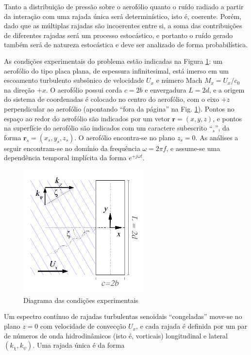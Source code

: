 \documentclass[a4paper, 11pt, twoside]{article}
\begin{document}
Tanto a distribuição de pressão sobre o aerofólio quanto o ruído radiado a partir da interação com uma rajada única será determinístico, isto é, coerente. Porém, dado que as múltiplas rajadas são incoerentes entre si, a soma das contribuições de diferentes rajadas será um processo estocástico, e portanto o ruído gerado também será de natureza estocástica e deve ser analizado de forma probabilística.

As condições experimentais do problema estão indicadas na Figura \ref{fig:experimental_setup}: um aerofólio do tipo placa plana, de espessura infinitesimal, está imerso em um escoamento turbulento subsônico de velocidade $U_x$ e número Mach $M_x = U_x/c_0$ na direção $+x$. O aerofólio possui corda $c=2b$ e envergadura $L=2d$, e a origem do sistema de coordenadas é colocado no centro do aerofólio, com o eixo $+z$ perpendicular ao aerofólio (apontando ``fora da página'' na Fig. \ref{fig:experimental_setup}). Pontos no espaço ao redor do aerofólio são indicados por um vetor $\mathbf{r}=(x, y, z)$, e pontos na superfície do aerofólio são indicados com um caractere subescrito ``$_s$'', da forma $\mathbf{r}_s = (x_s, y_s, z_s)$. O aerofólio encontra-se no plano $z_s = 0$. As análises a seguir encontram-se no domínio da frequência $\omega = 2 \pi f$, e assume-se uma dependência temporal implícita da forma $e^{+j \omega t}$.

\begin{figure}[htbp]
	\centering
	\includegraphics[width=0.6\textwidth]{../figures/Oblique_Gust_aerofoil.pdf}
	\caption{Diagrama das condições experimentais}
	\label{fig:experimental_setup}
\end{figure}

Um espectro contínuo de rajadas turbulentas senoidais ``congeladas'' move-se no plano $z=0$ com velocidade de convecção $U_x$, e cada rajada é definida por um par de números de onda hidrodinâmicos (isto é, vorticais) longitudinal e lateral $(k_\chi, k_\psi)$. Uma rajada única é da forma
\end{document}
